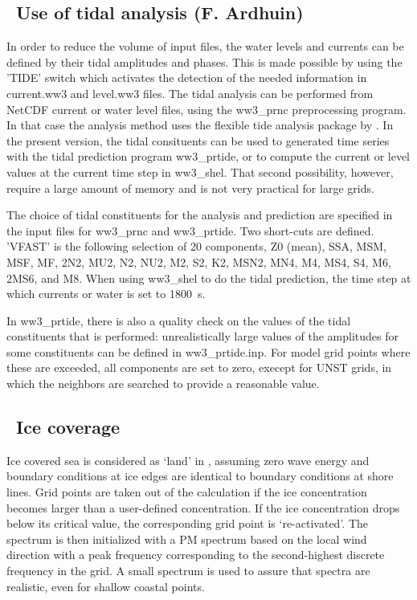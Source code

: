 \pb
\vssub
\subsection{~Use of tidal analysis \hfill {\rm (F. Ardhuin)}}
\vssub

\noindent
In order to reduce the volume of input files, the water levels and currents 
can be defined by their tidal amplitudes and phases. This is made possible 
by using the 'TIDE' switch which activates the detection of the needed 
information in current.ww3 
and level.ww3 files. The tidal analysis can be performed from NetCDF current 
or water level files, using the ww3\_prnc preprocessing program. In that case 
the analysis method uses the flexible tide analysis package by \cite{art:For09}. 
In the present version, the tidal consituents can be used to generated time series 
with the tidal prediction program ww3\_prtide, or to compute the current or level values at the current 
time step in ww3\_shel. That second possibility, however, require a large amount of memory and is not 
very practical for large grids. 

The choice of tidal constituents for the analysis and prediction are specified 
in the input files for ww3\_prnc and ww3\_prtide. Two short-cuts are 
defined. 'VFAST' is the following selection of 20 components,  
Z0 (mean), SSA, MSM, MSF, MF, 2N2, MU2, N2, NU2, M2, S2, K2, MSN2, MN4, M4, MS4, S4,
M6, 2MS6, and  M8. When using ww3\_shel to do the tidal prediction, 
 the time step at which currents or water is set to 1800~s. 

In ww3\_prtide, there is also a quality check on the values of the tidal constituents 
that is performed: unrealistically large values of the amplitudes for some 
constituents can be defined in ww3\_prtide.inp.  For model grid points where these 
are exceeded, all components are set to zero, execept for UNST grids, in which the 
neighbors are searched to provide a reasonable value. 



\vssub
\subsection{~Ice coverage} \label{sub:ice}
\vssub

\noindent
Ice covered sea is considered as `land' in \ws, assuming zero wave energy and
boundary conditions at ice edges are identical to boundary conditions at shore
lines. Grid points are taken out of the calculation if the ice concentration
becomes larger than a user-defined concentration. If the ice concentration
drops below its critical value, the corresponding grid point is
`re-activated'. The spectrum is then initialized with a PM spectrum based on
the local wind direction with a peak frequency corresponding to the
second-highest discrete frequency in the grid. A small spectrum is used to
assure that spectra are realistic, even for shallow coastal points.

